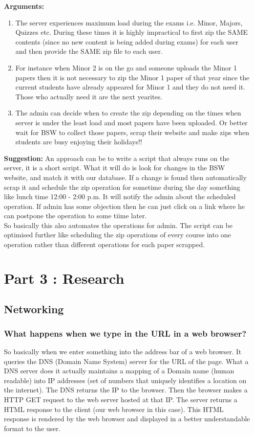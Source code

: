 \documentclass[12pt]{article}
\begin{document}
\textbf{Arguments:}
\begin{enumerate}
    \item The server experiences maximum load during the exams i.e. Minor, Majors, Quizzes etc. During these times it is highly impractical to first zip the SAME contents (since no new content is being added during exams) for each user and then provide the SAME zip file to each user. 
    \item For instance when Minor 2 is on the go and someone uploads the Minor 1 papers then it is not necessary to zip the Minor 1 paper of that year since the current students have already appeared for Minor 1 and they do not need it. Those who actually need it are the next yearites.
    \item The admin can decide when to create the zip depending on the times when server is under the least load and most papers have been uploaded. Or better wait for BSW to collect those papers, scrap their website and make zips when students are busy enjoying their holidays!!
\end{enumerate}

\textbf{Suggestion:} An approach can be to write a script that always runs on the server, it is a short script. What it will do is look for changes in the BSW website, and match it with our database. If a change is found then automatically scrap it and schedule the zip operation for sometime during the day something like lunch time 12:00 - 2:00 p.m. It will notify the admin about the scheduled operation. If admin has some objection then he can just click on a link where he can postpone the operation to some tiime later. \\[0.2cm]

So basically this also automates the operations for admin. The script can be optimised further like scheduling the zip operations of every course into one operation rather than different operations for each paper scrapped.

\newpage
\section{Part 3 : Research}

\subsection{Networking}
\subsubsection{What happens when we type in the URL in a web browser?}
So basically when we enter something into the address bar of a web browser. It queries the DNS (Domain Name System) server for the URL of the page.
What a DNS server does it actually maintains a mapping of a Domain name (human readable) into IP addresses (set of numbers that uniquely identifies a location on the internet).
The DNS returns the IP to the browser. Then the browser makes a HTTP GET request to the web server hosted at that IP. The server returns a HTML response to the client (our web browser in this case).
This HTML response is rendered by the web browser and displayed in a better understandable format to the user.
\end{document}
